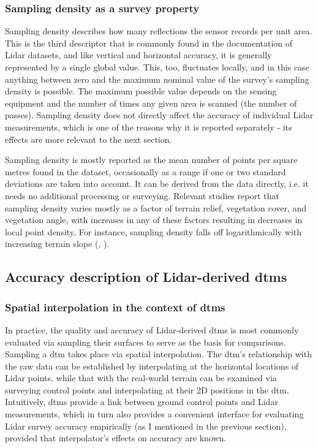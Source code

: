 \subsubsection{Sampling density as a survey property}

Sampling density describes how many reflections the sensor records per unit area. This is the third descriptor that is commonly found in the documentation of Lidar datasets, and like vertical and horizontal accuracy, it is generally represented by a single global value. This, too, fluctuates locally, and in this case anything between zero and the maximum nominal value of the survey's sampling density is possible. The maximum possible value depends on the sensing equipment and the number of times any given area is scanned (the number of passes). Sampling density does not directly affect the accuracy of individual Lidar measurements, which is one of the reasons why it is reported separately - its effects are more relevant to the next section.

Sampling density is mostly reported as the mean number of points per square metres found in the dataset, occasionally as a range if one or two standard deviations are taken into account. It can be derived from the data directly, i.e. it needs no additional processing or surveying. Relevant studies report that sampling density varies mostly as a factor of terrain relief, vegetation cover, and vegetation angle, with increases in any of these factors resulting in decreases in local point density. For instance, sampling density falls off logarithmically with increasing terrain slope (\cite{peng_shih_2006}, \cite{chow_hodgson_2009}).

\subsection{Accuracy description of Lidar-derived \ac{dtm}s}
\label{sub:lidaraccuracy_dem}

\subsubsection{Spatial interpolation in the context of \ac{dtm}s}

In practice, the quality and accuracy of Lidar-derived \ac{dtm}s is most commonly evaluated via sampling their surfaces to serve as the basis for comparisons. Sampling a \ac{dtm} takes place via spatial interpolation. The \ac{dtm}'s relationship with the raw data can be established by interpolating at the horizontal locations of Lidar points, while that with the real-world terrain can be examined via surveying control points and interpolating at their 2D positions in the \ac{dtm}. Intuitively, \ac{dtm}s provide a link between ground control points and Lidar measurements, which in turn also provides a convenient interface for evaluating Lidar survey accuracy empirically (as I mentioned in the previous section), provided that interpolator's effects on accuracy are known.

